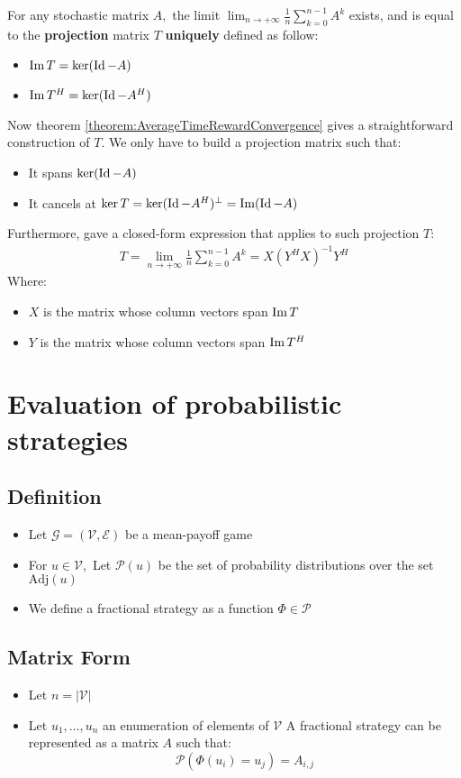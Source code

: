 \begin{theorem}
\label{theorem:AverageTimeRewardConvergence}
For any stochastic matrix $A,$ the limit $\displaystyle \lim_{n\rightarrow +\infty} \frac{1}{n}\sum_{k=0}^{n-1}A^k$ exists, and is equal to the \textbf{projection} matrix $T$ \textbf{uniquely} defined as follow:
\begin{itemize}
	\item $\operatorname{Im}  T = \ker (\operatorname{Id}-A)$
	\item $\operatorname{Im} T^H= \ker(\operatorname{Id} -A^H)$
\end{itemize}   	
\end{theorem}
Now theorem \ref{theorem:AverageTimeRewardConvergence} gives a straightforward construction of $T.$ We only have to build a projection matrix such that:
\begin{itemize}
	\item It spans $\ker(\operatorname{Id} -A)$
	\item It cancels at $\ker T = \ker(\operatorname{Id} -A^H)^\perp = \operatorname{Im} (\operatorname{Id} - A)$
\end{itemize} 
Furthermore, \citeauthor{AverageTimeRewardStochastic}\cite{AverageTimeRewardStochastic} gave a closed-form expression that applies to such projection $T$:
\begin{align}
T =\lim_{n\rightarrow +\infty}\frac{1}{n}\sum_{k=0}^{n-1}A^k =X(Y^HX)^{-1}Y^H
\end{align}
Where:
\begin{itemize}
	\item $X$ is the matrix whose column vectors span $\operatorname{Im} T$
	\item $Y$ is the matrix whose column vectors span $\operatorname{Im} T^H$
\end{itemize}
\section{Evaluation of probabilistic strategies}
\subsection{Definition}
\begin{itemize}
	\item Let $\mathcal{G}=(\mathcal{V},\mathcal{E})$ be a mean-payoff game
	\item For $u\in\mathcal{V},$ Let $\mathscr{P}(u)$ be the set of probability distributions over the set $\text{Adj}(u)$
	\item We define a fractional strategy as a function $\Phi\in \mathscr{P}$
	
\end{itemize}


\subsection{Matrix Form}
\begin{itemize}
	\item Let $n=\lvert \mathcal{V}\rvert$
	\item Let $u_1,\dots,u_n$ an enumeration of elements of $\mathcal{V}$
	A fractional strategy can be represented as a matrix $A$ such that:
	$$
	\mathcal{P}(\Phi(u_i)=u_j)=A_{i,j}
	$$
\end{itemize}


